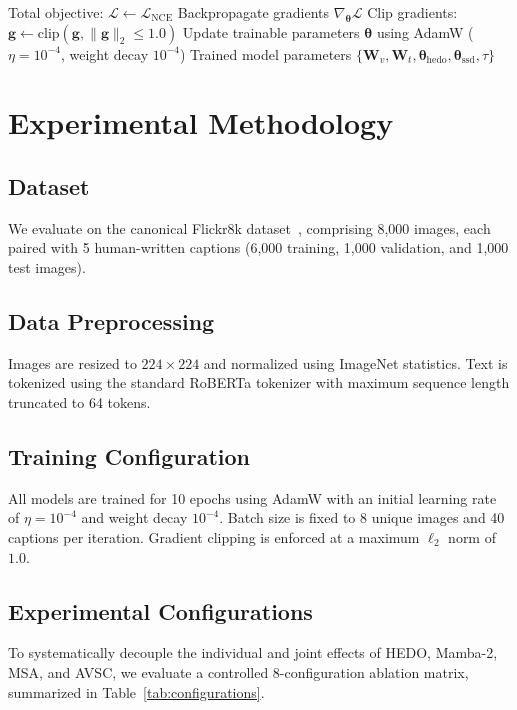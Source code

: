 \documentclass[10pt,journal,final]{IEEEtran}
\begin{document}
\begin{algorithm}[htbp]
\begin{algorithmic}[1]
        \ELSE
            \STATE Total objective: $\mathcal{L} \leftarrow \mathcal{L}_{\mathrm{NCE}}$
        \ENDIF
        \STATE Backpropagate gradients $\nabla_{\boldsymbol{\theta}} \mathcal{L}$
        \STATE Clip gradients: $\mathbf{g} \leftarrow \mathrm{clip}(\mathbf{g}, \|\mathbf{g}\|_2 \le 1.0)$
        \STATE Update trainable parameters $\boldsymbol{\theta}$ using AdamW ($\eta = 10^{-4}$, weight decay $10^{-4}$)
    \ENDFOR
\ENDFOR
\RETURN Trained model parameters $\{\mathbf{W}_v, \mathbf{W}_t, \boldsymbol{\theta}_{\mathrm{hedo}}, \boldsymbol{\theta}_{\mathrm{ssd}}, \tau\}$
\end{algorithmic}
\end{algorithm}

\section{Experimental Methodology}
\label{sec:methodology}

\subsection{Dataset}
We evaluate on the canonical Flickr8k dataset~\cite{hodosh2013framing}, comprising 8,000 images, each paired with 5 human-written captions (6,000 training, 1,000 validation, and 1,000 test images).

\subsection{Data Preprocessing}
Images are resized to $224 \times 224$ and normalized using ImageNet statistics. Text is tokenized using the standard RoBERTa tokenizer with maximum sequence length truncated to 64 tokens.

\subsection{Training Configuration}
All models are trained for 10 epochs using AdamW with an initial learning rate of $\eta = 10^{-4}$ and weight decay $10^{-4}$. Batch size is fixed to 8 unique images and 40 captions per iteration. Gradient clipping is enforced at a maximum $\ell_2$ norm of $1.0$.

\subsection{Experimental Configurations}
To systematically decouple the individual and joint effects of HEDO, Mamba-2, MSA, and AVSC, we evaluate a controlled 8-configuration ablation matrix, summarized in Table~\ref{tab:configurations}.
\end{document}
